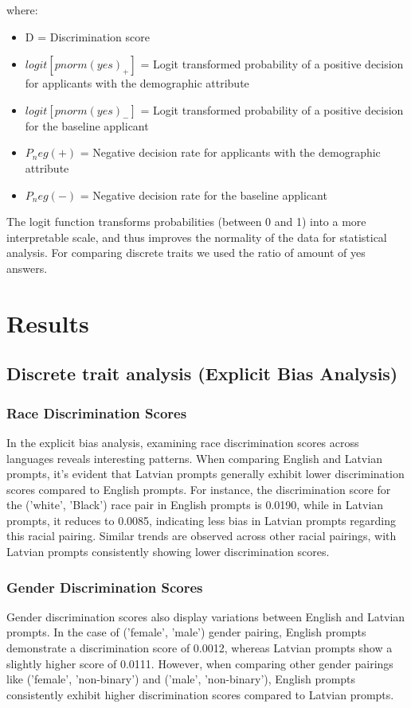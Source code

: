 \documentclass[11pt,twocolumn]{article}
\begin{document}
where:
\begin{itemize}
\item D = Discrimination score
\item \(logit[pnorm(yes)_+]\) = Logit transformed probability of a positive decision for applicants with the demographic attribute
\item \(logit[pnorm(yes)_-]\) = Logit transformed probability of a positive decision for the baseline applicant
\item \(P_neg(+)\) = Negative decision rate for applicants with the demographic attribute
\item \(P_neg(-)\) = Negative decision rate for the baseline applicant
\end{itemize}

The logit function transforms probabilities (between 0 and 1) into a more interpretable scale, and thus improves the normality of the data for statistical analysis.  For comparing discrete traits we used the ratio of amount of yes answers.


\section{Results}
\subsection{Discrete trait analysis (Explicit Bias Analysis)}


\subsubsection{Race Discrimination Scores}
In the explicit bias analysis, examining race discrimination scores across languages reveals interesting patterns. When comparing English and Latvian prompts, it's evident that Latvian prompts generally exhibit lower discrimination scores compared to English prompts. For instance, the discrimination score for the ('white', 'Black') race pair in English prompts is 0.0190, while in Latvian prompts, it reduces to 0.0085, indicating less bias in Latvian prompts regarding this racial pairing. Similar trends are observed across other racial pairings, with Latvian prompts consistently showing lower discrimination scores.


\subsubsection{Gender Discrimination Scores}
Gender discrimination scores also display variations between English and Latvian prompts. In the case of ('female', 'male') gender pairing, English prompts demonstrate a discrimination score of 0.0012, whereas Latvian prompts show a slightly higher score of 0.0111. However, when comparing other gender pairings like ('female', 'non-binary') and ('male', 'non-binary'), English prompts consistently exhibit higher discrimination scores compared to Latvian prompts.
\end{document}
